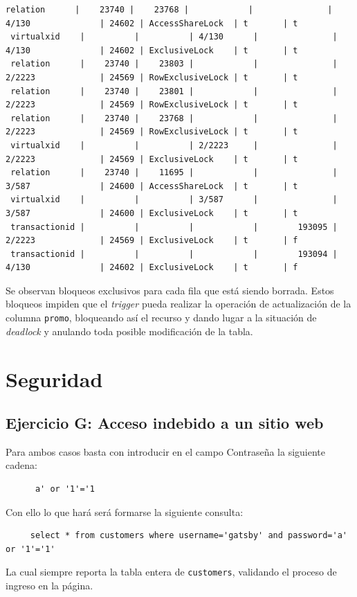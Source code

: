 \documentclass{article}
\begin{document}
\begin{lstlisting}[basicstyle=\tiny]
 relation      |    23740 |    23768 |            |               | 4/130              | 24602 | AccessShareLock  | t       | t
 virtualxid    |          |          | 4/130      |               | 4/130              | 24602 | ExclusiveLock    | t       | t
 relation      |    23740 |    23803 |            |               | 2/2223             | 24569 | RowExclusiveLock | t       | t
 relation      |    23740 |    23801 |            |               | 2/2223             | 24569 | RowExclusiveLock | t       | t
 relation      |    23740 |    23768 |            |               | 2/2223             | 24569 | RowExclusiveLock | t       | t
 virtualxid    |          |          | 2/2223     |               | 2/2223             | 24569 | ExclusiveLock    | t       | t
 relation      |    23740 |    11695 |            |               | 3/587              | 24600 | AccessShareLock  | t       | t
 virtualxid    |          |          | 3/587      |               | 3/587              | 24600 | ExclusiveLock    | t       | t
 transactionid |          |          |            |        193095 | 2/2223             | 24569 | ExclusiveLock    | t       | f
 transactionid |          |          |            |        193094 | 4/130              | 24602 | ExclusiveLock    | t       | f
\end{lstlisting}
Se observan bloqueos exclusivos para cada fila que está siendo borrada. Estos bloqueos impiden que el \textit{trigger} pueda realizar la operación de actualización de la columna \texttt{promo}, bloqueando así el recurso y dando lugar a la situación de \textit{deadlock} y anulando toda posible modificación de la tabla.
\section{Seguridad}
\subsection{Ejercicio G: {\small Acceso indebido a un sitio web}}
Para ambos casos basta con introducir en el campo Contraseña la siguiente cadena:
\begin{lstlisting}
      a' or '1'='1
\end{lstlisting}
Con ello lo que hará será formarse la siguiente consulta:
\begin{lstlisting}
     select * from customers where username='gatsby' and password='a' or '1'='1'
\end{lstlisting}
La cual siempre reporta la tabla entera de \texttt{customers}, validando el proceso de ingreso en la página.
\end{document}
